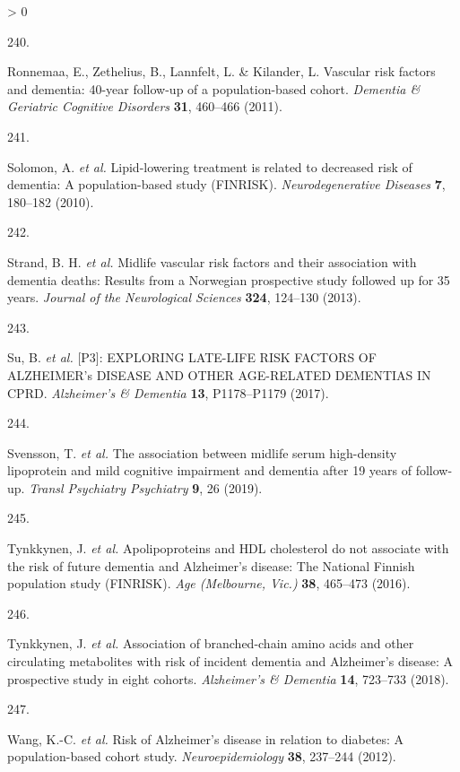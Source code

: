 \documentclass[a4paper, twoside]{templates/ociamthesis}
\newlength{\cslhangindent}
\newlength{\csllabelwidth}
\newenvironment{CSLReferences}[3] %
 {%
  \setlength{\parindent}{0pt}
  \ifodd #1 \everypar{\setlength{\hangindent}{\cslhangindent}}\ignorespaces\fi
  \ifnum #2 > 0
  \setlength{\parskip}{#2\baselineskip}
  \fi
 }%
 {}
\newcommand{\CSLLeftMargin}[1]{\parbox[t]{\maxof{\widthof{#1}}{\csllabelwidth}}{#1}}
\newcommand{\CSLRightInline}[1]{\parbox[t]{\linewidth - \csllabelwidth}{#1}}
\begin{document}
\begin{CSLReferences}{0}{0}
\leavevmode\hypertarget{ref-ronnemaa2011}{}%
\CSLLeftMargin{240. }
\CSLRightInline{Ronnemaa, E., Zethelius, B., Lannfelt, L. \& Kilander, L. Vascular risk factors and dementia: 40-year follow-up of a population-based cohort. \emph{Dementia \& Geriatric Cognitive Disorders} \textbf{31}, 460--466 (2011).}

\leavevmode\hypertarget{ref-solomon2010}{}%
\CSLLeftMargin{241. }
\CSLRightInline{Solomon, A. \emph{et al.} Lipid-lowering treatment is related to decreased risk of dementia: A population-based study ({FINRISK}). \emph{Neurodegenerative Diseases} \textbf{7}, 180--182 (2010).}

\leavevmode\hypertarget{ref-strand2013}{}%
\CSLLeftMargin{242. }
\CSLRightInline{Strand, B. H. \emph{et al.} Midlife vascular risk factors and their association with dementia deaths: Results from a {Norwegian} prospective study followed up for 35 years. \emph{Journal of the Neurological Sciences} \textbf{324}, 124--130 (2013).}

\leavevmode\hypertarget{ref-su2017}{}%
\CSLLeftMargin{243. }
\CSLRightInline{Su, B. \emph{et al.} {[}{P3}{}{]}: {EXPLORING LATE}-{LIFE RISK FACTORS OF ALZHEIMER}'s {DISEASE AND OTHER AGE}-{RELATED DEMENTIAS IN CPRD}. \emph{Alzheimer's \& Dementia} \textbf{13}, P1178--P1179 (2017).}

\leavevmode\hypertarget{ref-svensson2019}{}%
\CSLLeftMargin{244. }
\CSLRightInline{Svensson, T. \emph{et al.} The association between midlife serum high-density lipoprotein and mild cognitive impairment and dementia after 19 years of follow-up. \emph{Transl Psychiatry Psychiatry} \textbf{9}, 26 (2019).}

\leavevmode\hypertarget{ref-tynkkynen2016}{}%
\CSLLeftMargin{245. }
\CSLRightInline{Tynkkynen, J. \emph{et al.} Apolipoproteins and {HDL} cholesterol do not associate with the risk of future dementia and {Alzheimer}'s disease: The {National Finnish} population study ({FINRISK}). \emph{Age (Melbourne, Vic.)} \textbf{38}, 465--473 (2016).}

\leavevmode\hypertarget{ref-tynkkynen2018}{}%
\CSLLeftMargin{246. }
\CSLRightInline{Tynkkynen, J. \emph{et al.} Association of branched-chain amino acids and other circulating metabolites with risk of incident dementia and {Alzheimer}'s disease: A prospective study in eight cohorts. \emph{Alzheimer's \& Dementia} \textbf{14}, 723--733 (2018).}

\leavevmode\hypertarget{ref-wang2012}{}%
\CSLLeftMargin{247. }
\CSLRightInline{Wang, K.-C. \emph{et al.} Risk of {Alzheimer}'s disease in relation to diabetes: A population-based cohort study. \emph{Neuroepidemiology} \textbf{38}, 237--244 (2012).}


\end{CSLReferences}
\end{document}
